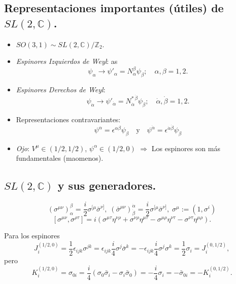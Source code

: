 \documentclass[10pt,a4paper]{beamer}
\begin{document}
\subsection{Representaciones importantes (útiles) de  $SL(2,\mathbb{C})$.}
\begin{frame}{\subsecname}
  \begin{itemize}
 \item  $SO(3,1) \sim SL(2,\mathbb{C})/\mathbb{Z}_2$.
  
\item \emph{Espinores Izquierdos de Weyl}:
as
\[
  \psi_\alpha \to \psi'_\alpha = N_\alpha^\beta \psi_\beta;\quad \alpha,\beta =
  1,2.
\]

\item \emph{Espinores Derechos de Weyl}:
\[
  \psi_{\dot\alpha} \to \psi'_{\dot\alpha} = N_{\dot\alpha}^{* \,\dot\beta}
  \psi_{\dot\beta}; \quad\dot\alpha,\dot\beta = 1,2.
\]
\item Representaciones contravariantes:
\[
  \psi^\alpha = \epsilon^{\alpha\beta} \psi_\beta \quad \text{y} \quad
  \psi^{\dot\alpha} = \epsilon^{\dot\alpha\dot\beta} \psi_{\dot\beta}
\]

\item \emph{Ojo}: $V^\mu \in (1/2,1/2)$, $\psi^\alpha \in (1/2,0)$
  $\Rightarrow$ Los espinores son más fundamentales (maomenos).
  \end{itemize}
\end{frame}

\subsection{ $SL(2,\mathbb{C})$ y sus generadores.}
\begin{frame}{\subsecname}
\[
  \left( \sigma^{\mu\nu}\right)_\alpha^{\beta} = \frac{i}{2}
  \sigma^{[\mu}
\bar\sigma^{\nu]},\;
%
\left( \bar\sigma^{\mu\nu}\right)^{\dot\alpha}_{\dot\beta} = \frac{i}{2}
  \sigma^{[\mu}
  \bar\sigma^{\nu]},\;\sigma^\mu := (1,\sigma^i)
\]
\[
  \left[\sigma^{\mu\nu},\sigma^{\rho\tau}\right] = i\left(\sigma^{\mu\tau}\eta^{\nu\rho} +\sigma^{\nu\rho}\eta^{\mu\tau} -
  \sigma^{\mu\rho}\eta^{\nu\tau} - \sigma^{\nu\tau}\eta^{\mu\rho} \right).\]
  

  Para los espinores
\[
  J^{(1/2,0)}_i = \frac{1}{2} \epsilon_{ijk} \sigma^{jk} = \epsilon_{ijk}
  \frac{i}{4}\sigma^{j}\bar\sigma^k = -\epsilon_{ijk}
  \frac{i}{4}\sigma^{j}\sigma^k = \frac{1}{2} \sigma _i = J^{(0,1/2)}_i,
\]
pero
\[
  K^{(1/2,0)}_i = \sigma_{0i} = \frac{i}{4}\left(\sigma_{0}\bar\sigma_i -
    \sigma_{i}\bar\sigma_0\right ) = -\frac{i}{4}\sigma_i = -\bar\sigma_{0i} =
    -K^{(0,1/2)}_i.
\]

\end{frame}
\end{document}
